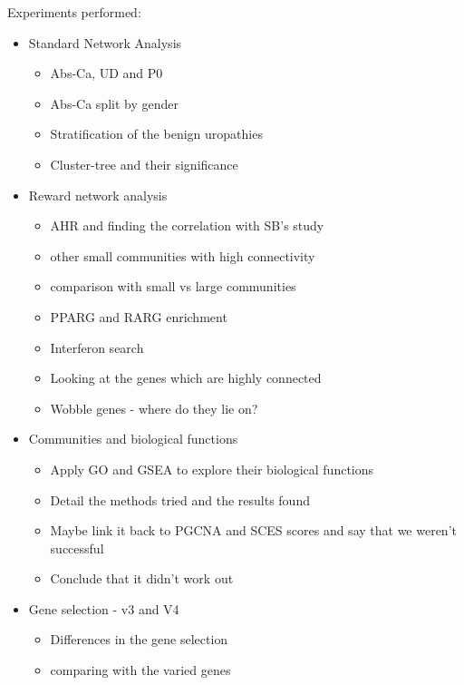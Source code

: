 Experiments performed:
\begin{itemize}
    \item Standard Network Analysis
    \begin{itemize}
        \item Abs-Ca, UD and P0
        \item Abs-Ca split by gender
        \item Stratification of the benign uropathies 
        \item Cluster-tree and their significance
    \end{itemize}
  \item Reward network analysis
    \begin{itemize}
        \item AHR and finding the correlation with SB's study
        \item other small communities with high connectivity
        \item comparison with small vs large communities
        \item PPARG and RARG enrichment
        \item Interferon search
        \item Looking at the genes which are highly connected
        \item Wobble genes - where do they lie on?
    \end{itemize}
    \item Communities and biological functions 
    \begin{itemize}
        \item Apply GO and GSEA to explore their biological functions
        \item Detail the methods tried and the results found
        \item Maybe link it back to PGCNA and SCES scores and say that we weren't successful
        \item Conclude that it didn't work out
    \end{itemize}
    \item Gene selection - v3 and V4
    \begin{itemize}
        \item Differences in the gene selection
        \item comparing with the varied genes
    \end{itemize}
\end{itemize}


